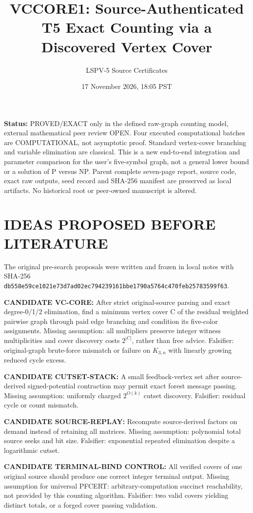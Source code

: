 \documentclass[11pt]{article}
\title{VCCORE1: Source-Authenticated T5 Exact Counting via a Discovered Vertex Cover}
\author{LSPV-5 Source Certificates}
\date{17 November 2026, 18:05 PST}
\begin{document}
\maketitle
\noindent\textbf{Status:} PROVED/EXACT only in the defined raw-graph counting model, external mathematical peer review OPEN. Four executed computational batches are COMPUTATIONAL, not asymptotic proof. Standard vertex-cover branching and variable elimination are classical. This is a new end-to-end integration and parameter comparison for the user's five-symbol graph, not a general lower bound or a solution of P versus NP. Parent complete seven-page report, source code, exact raw outputs, seed record and SHA-256 manifest are preserved as local artifacts. No historical root or peer-owned manuscript is altered.

\section{IDEAS PROPOSED BEFORE LITERATURE}
The original pre-search proposals were written and frozen in local notes with SHA-256 \texttt{db558e59ce1021e73d7ad02ec794239161bbe1790a5764c470feb25783599f63}.
\par\noindent\textbf{CANDIDATE VC-CORE:} After strict original-source parsing and exact degree-0/1/2 elimination, find a minimum vertex cover C of the residual weighted pairwise graph through paid edge branching and condition its five-color assignments. Missing assumption: all multipliers preserve integer witness multiplicities and cover discovery costs $2^{|C|}$, rather than free advice. Falsifier: original-graph brute-force mismatch or failure on $K_{3,n}$ with linearly growing reduced cycle excess.
\par\noindent\textbf{CANDIDATE CUTSET-STACK:} A small feedback-vertex set after source-derived signed-potential contraction may permit exact forest message passing. Missing assumption: uniformly charged $2^{O(k)}$ cutset discovery. Falsifier: residual cycle or count mismatch.
\par\noindent\textbf{CANDIDATE SOURCE-REPLAY:} Recompute source-derived factors on demand instead of retaining all matrices. Missing assumption: polynomial total source seeks and bit size. Falsifier: exponential repeated elimination despite a logarithmic cutset.
\par\noindent\textbf{CANDIDATE TERMINAL-BIND CONTROL:} All verified covers of one original source should produce one correct integer terminal output. Missing assumption for universal PFCERT: arbitrary-computation succinct reachability, not provided by this counting algorithm. Falsifier: two valid covers yielding distinct totals, or a forged cover passing validation.
\end{document}
